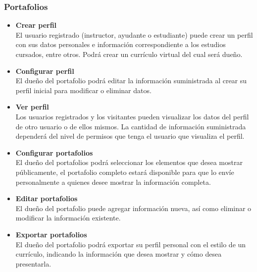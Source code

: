 \subsubsection{Portafolios}
\begin{itemize}
	\item \textbf{Crear perfil}\\
	El usuario registrado (instructor, ayudante o estudiante) puede crear un perfil con sus datos personales e información correspondiente a los estudios cursados, entre otros. Podrá crear un currículo virtual del cual será dueño. 
	\item \textbf{Configurar perfil}\\
	El dueño del portafolio podrá editar la información suministrada al crear su perfil inicial para modificar o eliminar datos.
	\item \textbf{Ver perfil}\\
	Los usuarios registrados y los visitantes pueden visualizar los datos del perfil de otro usuario o de ellos mismos. La cantidad de información suministrada dependerá del nivel de permisos que tenga el usuario que visualiza el perfil.
	\item \textbf{Configurar portafolios}\\
	El dueño del portafolios podrá seleccionar los elementos que desea mostrar públicamente, el portafolio completo estará disponible para que lo envíe personalmente a quienes desee mostrar la información completa.
	\item \textbf{Editar portafolios}\\
	El dueño del portafolio puede agregar información nueva, así como eliminar o modificar la información existente.  
	\item \textbf{Exportar portafolios}\\
	El dueño del portafolio podrá exportar su perfil personal con el estilo de un currículo, indicando la información que desea mostrar y cómo desea presentarla.
\end{itemize}

